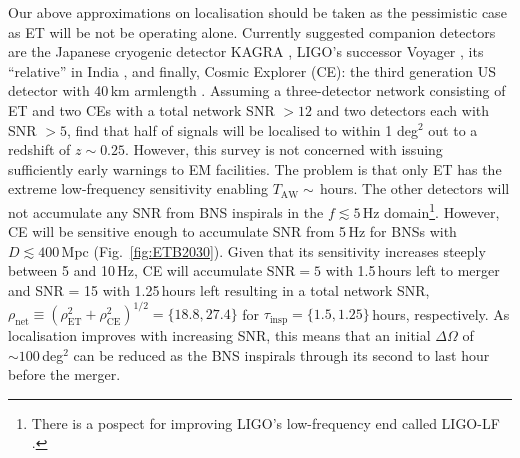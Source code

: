 \documentclass{aa}
\begin{document}

Our above approximations on localisation should be taken as the pessimistic case as 
ET will be not be operating alone. 
Currently suggested companion detectors are the Japanese cryogenic detector KAGRA \citep{Akutsu:2017thy,KAGRA2}, LIGO's successor Voyager \citep{LIGO_Voy}, its ``relative'' in India \citep{Unnikrishnan:2013qwa}, 
and finally, Cosmic Explorer (CE): the third generation US detector with 40\,km armlength \citep{Evans:2016mbw}.  
Assuming a three-detector network consisting of ET and two CEs with a total network SNR $> 12$ and two detectors 
each with SNR $> 5$, \cite{Mills:2017urp} find that half of signals will be localised to within 1 deg$^2$ 
out to a redshift of $z\sim 0.25$. However, this survey is not concerned with issuing sufficiently early warnings to EM facilities. %
The problem is that only ET has the extreme low-frequency sensitivity enabling $T_\text{AW}\sim\,$hours.
The other detectors will not accumulate any SNR from BNS inspirals in the $f\lesssim 5\,$Hz domain\footnote{There is a pospect for improving LIGO's low-frequency end called LIGO-LF \citep{Yu:2017zgi}.}.
However, CE will be sensitive enough to accumulate SNR from 5\,Hz for BNSs with $D\lesssim 400\,$Mpc (Fig.~\ref{fig:ETB2030}).
Given that its sensitivity increases steeply between 5 and 10\,Hz, CE will accumulate $\text{SNR} = 5$ with 1.5\,hours left to merger and SNR = 15 with 1.25\,hours left
resulting in a total network SNR, $\rho_\text{net} \equiv (\rho_\text{ET}^2+\rho_\text{CE}^2)^{1/2}=\{18.8,27.4\}$ %
for $\tau_\text{insp}=\{1.5, 1.25\}\,$hours, respectively.
As localisation improves with increasing SNR, this means that an initial $\Delta\Omega$ of $\sim 100\,$deg$^2$
can be reduced as the BNS inspirals through its second to last hour before the merger.
\end{document}
